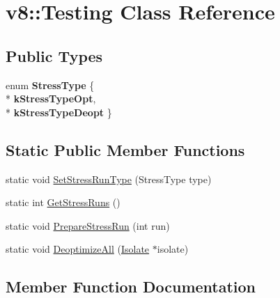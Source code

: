 \hypertarget{classv8_1_1_testing}{}\section{v8\+:\+:Testing Class Reference}
\label{classv8_1_1_testing}
\subsection*{Public Types}
\begin{DoxyCompactItemize}
\item 
enum {\bfseries Stress\+Type} \{ \\*
{\bfseries k\+Stress\+Type\+Opt}, 
\\*
{\bfseries k\+Stress\+Type\+Deopt}
 \}\hypertarget{classv8_1_1_testing_a436a1a521a0bc070cc0b46ad7a658575}{}\label{classv8_1_1_testing_a436a1a521a0bc070cc0b46ad7a658575}

\end{DoxyCompactItemize}
\subsection*{Static Public Member Functions}
\begin{DoxyCompactItemize}
\item 
static void \hyperlink{classv8_1_1_testing_ae77a4350f86d915ffa3dacc30f07d74b}{Set\+Stress\+Run\+Type} (Stress\+Type type)
\item 
static int \hyperlink{classv8_1_1_testing_a85ab1c8e52fa31fabbf7c44096cdd070}{Get\+Stress\+Runs} ()
\item 
static void \hyperlink{classv8_1_1_testing_aae3f1fc97dc6e4e52a9f4cfef55f8672}{Prepare\+Stress\+Run} (int run)
\item 
static void \hyperlink{classv8_1_1_testing_a10e371c433b21a61d1b857db753d6a9b}{Deoptimize\+All} (\hyperlink{classv8_1_1_isolate}{Isolate} $\ast$isolate)
\end{DoxyCompactItemize}


\subsection{Member Function Documentation}
